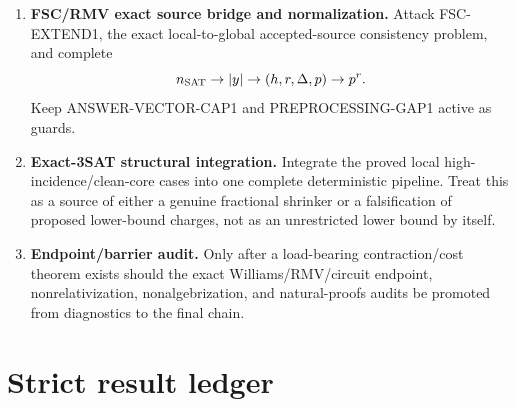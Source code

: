 \documentclass[11pt]{article}
\theoremstyle{plain}
\theoremstyle{definition}
\theoremstyle{remark}
\begin{document}
\begin{enumerate}[leftmargin=1.6em]
\item \textbf{FSC/RMV exact source bridge and normalization.}
Attack FSC-EXTEND1, the exact local-to-global accepted-source consistency
problem, and complete
\[
n_{\rm SAT}\to|y|\to(h,r,\Delta,p)\to p^r.
\]
Keep ANSWER-VECTOR-CAP1 and PREPROCESSING-GAP1 active as guards.

\item \textbf{Exact-3SAT structural integration.}
Integrate the proved local high-incidence/clean-core cases into one complete
deterministic pipeline.  Treat this as a source of either a genuine
fractional shrinker or a falsification of proposed lower-bound charges, not as
an unrestricted lower bound by itself.

\item \textbf{Endpoint/barrier audit.}
Only after a load-bearing contraction/cost theorem exists should the exact
Williams/RMV/circuit endpoint, nonrelativization, nonalgebrization, and
natural-proofs audits be promoted from diagnostics to the final chain.
\end{enumerate}

\section{Strict result ledger}
\end{document}
